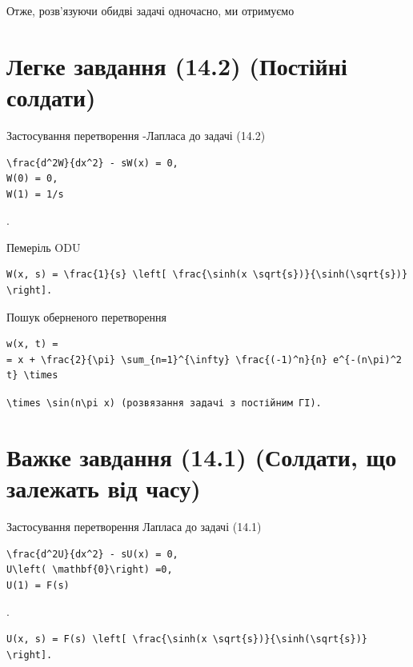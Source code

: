 \documentclass[
  ukrainian,
]{article}
\begin{document}
Отже, розв'язуючи обидві задачі одночасно, ми отримуємо

\section{Легке завдання (14.2) (Постійні
солдати)}\label{ux43bux435ux433ux43aux435-ux437ux430ux432ux434ux430ux43dux43dux44f-14.2-ux43fux43eux441ux442ux456ux439ux43dux456-ux441ux43eux43bux434ux430ux442ux438}

Застосування перетворення -Лапласа до задачі (14.2)

\begin{verbatim}
\frac{d^2W}{dx^2} - sW(x) = 0,
W(0) = 0,
W(1) = 1/s
\end{verbatim}

.

Пемеріль ODU

\begin{verbatim}
W(x, s) = \frac{1}{s} \left[ \frac{\sinh(x \sqrt{s})}{\sinh(\sqrt{s})} \right].
\end{verbatim}

Пошук оберненого перетворення

\begin{verbatim}
w(x, t) =
= x + \frac{2}{\pi} \sum_{n=1}^{\infty} \frac{(-1)^n}{n} e^{-(n\pi)^2 t} \times
\end{verbatim}

\texttt{\textquotesingle{}\textbackslash{}times\ \textbackslash{}sin(n\textbackslash{}pi\ x)\textquotesingle{}\ (розв\textquotesingle{}язання\ задачі\ з\ постійним\ ГІ).}

\section{Важке завдання (14.1) (Солдати, що залежать від
часу)}\label{ux432ux430ux436ux43aux435-ux437ux430ux432ux434ux430ux43dux43dux44f-14.1-ux441ux43eux43bux434ux430ux442ux438-ux449ux43e-ux437ux430ux43bux435ux436ux430ux442ux44c-ux432ux456ux434-ux447ux430ux441ux443}

Застосування перетворення Лапласа до задачі (14.1)

\begin{verbatim}
\frac{d^2U}{dx^2} - sU(x) = 0,
U\left( \mathbf{0}\right) =0,
U(1) = F(s)
\end{verbatim}

.

\begin{verbatim}
U(x, s) = F(s) \left[ \frac{\sinh(x \sqrt{s})}{\sinh(\sqrt{s})} \right].
\end{verbatim}
\end{document}
